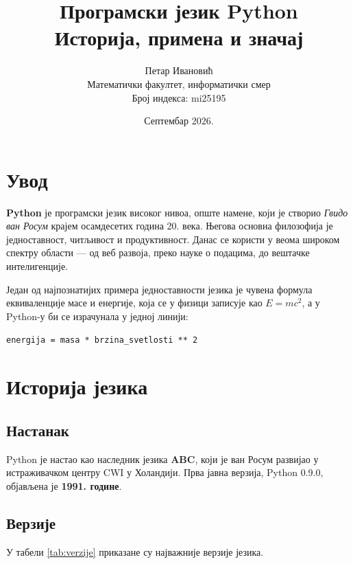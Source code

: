 \documentclass[12pt,a4paper]{article}
\title{\textbf{\color{plava}Програмски језик Python}\\
       \large Историја, примена и значај}
\author{Петар Ивановић \\ \small Математички факултет, информатички смер \\ \small Број индекса: mi25195}
\date{Септембар 2026.}
\begin{document}
\maketitle
\thispagestyle{empty}
\newpage

\tableofcontents
\newpage

\section{Увод}

\textbf{Python} је програмски језик високог нивоа, опште намене, који је
створио \textit{Гвидо ван Росум} крајем осамдесетих година 20. века.
Његова основна филозофија је \textcolor{zelena}{једноставност, читљивост и
продуктивност}. Данас се користи у веома широком спектру области — од
веб развоја, преко науке о подацима, до вештачке интелигенције.

Један од најпознатијих примера једноставности језика је чувена
формула еквиваленције масе и енергије, која се у физици записује као
$E = mc^2$, а у Python-у би се израчунала у једној линији:

\begin{center}
\texttt{energija = masa * brzina\_svetlosti ** 2}
\end{center}

\section{Историја језика}

\subsection{Настанак}

Python је настао као наследник језика \textbf{ABC}, који је ван Росум
развијао у истраживачком центру CWI у Холандији. Прва јавна верзија,
Python 0.9.0, објављена је \textbf{1991. године}.

\subsection{Верзије}

У табели \ref{tab:verzije} приказане су најважније верзије језика.
\end{document}
